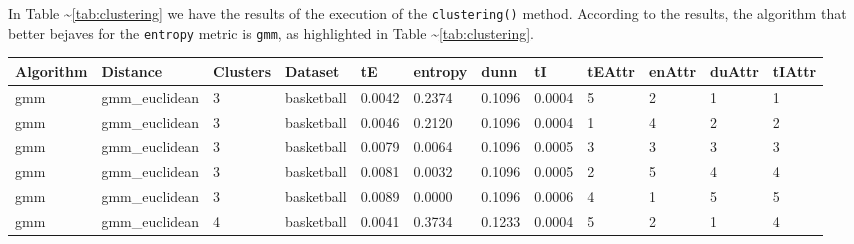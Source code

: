 \documentclass[
]{article}
\begin{document}
In Table \textasciitilde{}\ref{tab:clustering} we have the results of
the execution of the \texttt{clustering()} method. According to the
results, the algorithm that better bejaves for the \texttt{entropy}
metric is \texttt{gmm}, as highlighted in Table
\textasciitilde{}\ref{tab:clustering}.

\begin{longtable}{| p{1.1cm} | p{2cm} | p{0.8cm} | p{1.3cm} | p{0.60cm} | p{0.7cm} | p{0.65cm} | p{0.65cm} | p{0.65cm} | p{0.65cm} | p{0.7cm} | p{0.65cm} |}
\hline
\scriptsize  Algorithm & \scriptsize  Distance  &  \scriptsize Clusters & \scriptsize  Dataset & \scriptsize tE  & \scriptsize entropy & \scriptsize  dunn  & \scriptsize tI & \scriptsize tEAttr  & \scriptsize enAttr & \scriptsize duAttr & \scriptsize tIAttr \\
\hline
\scriptsize     gmm   & \scriptsize   gmm\_euclidean & \scriptsize    3    & \scriptsize basketball & \scriptsize    0.0042  &  \scriptsize 0.2374  & \scriptsize 0.1096 & \scriptsize    0.0004  &  \scriptsize    5  & \scriptsize    2  & \scriptsize    1  & \scriptsize    1 \\
\scriptsize     gmm   & \scriptsize   gmm\_euclidean  & \scriptsize    3   &  \scriptsize basketball  & \scriptsize    0.0046  &  \scriptsize 0.2120  & \scriptsize 0.1096 & \scriptsize    0.0004 &   \scriptsize    1  & \scriptsize    4 &  \scriptsize    2 &  \scriptsize    2 \\
\scriptsize     gmm   & \scriptsize   gmm\_euclidean & \scriptsize    3   &  \scriptsize basketball & \scriptsize    0.0079  &  \scriptsize 0.0064  &\scriptsize 0.1096 & \scriptsize    0.0005 &   \scriptsize    3  &  \scriptsize    3  &  \scriptsize    3  & \scriptsize    3 \\
\scriptsize     gmm   & \scriptsize   gmm\_euclidean & \scriptsize    3 &  \scriptsize basketball & \scriptsize    0.0081  &  \scriptsize 0.0032  & \scriptsize 0.1096 & \scriptsize    0.0005 &   \scriptsize    2  & \scriptsize    5  & \scriptsize    4  & \scriptsize    4 \\
\scriptsize     gmm   & \scriptsize   gmm\_euclidean & \scriptsize    3     & \scriptsize basketball & \scriptsize    0.0089  &  \scriptsize 0.0000 &  \scriptsize 0.1096 & \scriptsize    0.0006 &   \scriptsize    4  & \scriptsize    1  & \scriptsize    5  & \scriptsize    5 \\
\cline{3-12}
\scriptsize     gmm   & \scriptsize   gmm\_euclidean & \scriptsize    4     & \scriptsize basketball  & \scriptsize    0.0041  & \scriptsize 0.3734 &  \scriptsize 0.1233 & \scriptsize    0.0004 &   \scriptsize    5 & \scriptsize    2  & \scriptsize    1  & \scriptsize    4 \\

\end{longtable}
\end{document}
